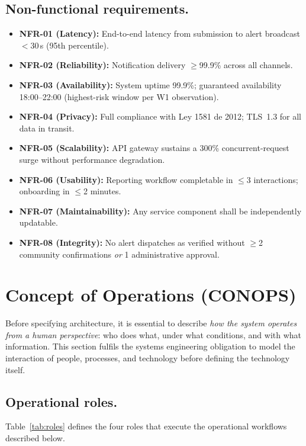 \documentclass[12pt,a4paper]{article}
\begin{document}
\subsection{Non-functional requirements.}
\begin{itemize}
\item \textbf{NFR-01 (Latency):} End-to-end latency from submission to alert broadcast $<$30\,s (95th percentile).
\item \textbf{NFR-02 (Reliability):} Notification delivery $\geq$99.9\% across all channels.
\item \textbf{NFR-03 (Availability):} System uptime 99.9\%; guaranteed availability 18:00--22:00 (highest-risk window per W1 observation).
\item \textbf{NFR-04 (Privacy):} Full compliance with Ley 1581 de 2012; TLS~1.3 for all data in transit.
\item \textbf{NFR-05 (Scalability):} API gateway sustains a 300\% concurrent-request surge without performance degradation.
\item \textbf{NFR-06 (Usability):} Reporting workflow completable in $\leq$3 interactions; onboarding in $\leq$2 minutes.
\item \textbf{NFR-07 (Maintainability):} Any service component shall be independently updatable.
\item \textbf{NFR-08 (Integrity):} No alert dispatches as verified without $\geq$2 community confirmations \emph{or} 1 administrative approval.
\end{itemize}

\section{Concept of Operations (CONOPS)}
\label{sec:conops}

Before specifying architecture, it is essential to describe \emph{how
the system operates from a human perspective}: who does what, under
what conditions, and with what information. This section fulfils the
systems engineering obligation to model the interaction of people,
processes, and technology before defining the technology itself.

\subsection{Operational roles.}
Table~\ref{tab:roles} defines the four roles that execute the
operational workflows described below.
\end{document}
